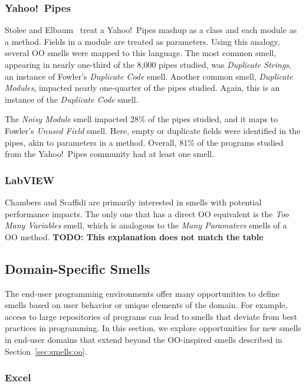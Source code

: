 \documentclass[10pt,conference,compsocconf]{IEEEtran}
\newcommand{\todo}[1]{\textbf{TODO: #1}}
\begin{document}
\subsubsection{Yahoo!\ Pipes}
Stolee and Elbaum~\cite{Stolee2011, StoleeTSE2013} treat a Yahoo!\ Pipes mashup as a class and each module as a method.  Fields in a module are treated as parameters. Using this analogy,  several OO smells were mapped to this language. The most common smell, appearing in nearly one-third of the 8,000 pipes studied, was \emph{Duplicate Strings}, an instance of Fowler's \emph{Duplicate Code} smell. 
Another common smell, \emph{Duplicate Modules}, impacted nearly one-quarter of the pipes studied. Again, this is an instance of the \emph{Duplicate Code} smell. 

The \emph{Noisy Module} smell impacted 28\% of the pipes studied, and it maps to Fowler's \emph{Unused Field} smell. Here,  empty or duplicate fields were identified in the pipes, akin to parameters in a method. Overall, 81\% of the programs studied from the Yahoo!\ Pipes community had at least one smell. 

\subsubsection{LabVIEW}

Chambers and Scaffidi \cite{chambers2013smell} are primarily interested in smells with potential performance impacts. The only one that has a direct OO equivalent is the \emph{Too Many Variables} smell, which is analogous to the \emph{Many Paramaters} smells of a OO method. \todo{This explanation does not match the table}

\subsection{Domain-Specific Smells}
\label{sec:smells:domain}
The end-user programming environments offer many opportunities to define smells based on user behavior or unique elements of the domain. For example, access to large repositories of programs can lead to smells that deviate from best practices in programming. In this section, we explore opportunities for new smells in end-user domains that extend beyond the OO-inspired smells described in Section~\ref{sec:smells:oo}. 

\subsubsection{Excel}
\end{document}
